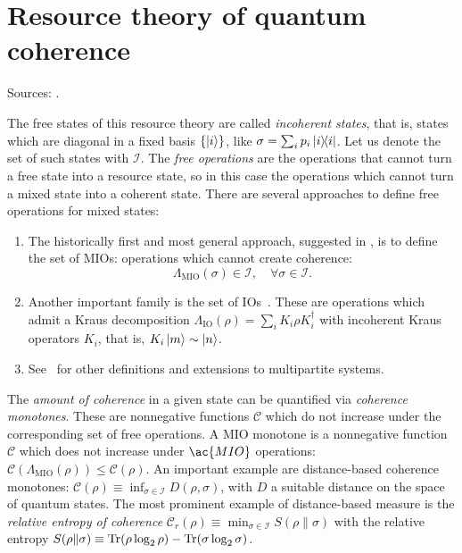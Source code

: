 \documentclass[a4paper]{report}
\newcommand{\on}[1]{\operatorname{#1}}
\begin{document}
\section{Resource theory of quantum coherence}
\newcommand{\setIncoherentStates}{\mathcal{I}}
Sources: \cite{aberg2006quantifying,baumgratz2014quantifying,winter2016operational,marvian2016how,streltsov2016quantum}.

The free states of this resource theory are called \emph{incoherent states},
that is, states which are diagonal in a fixed basis $\{\ket i\}$, like $\sigma = \sum_i p_i \ketbra{i}$.
Let us denote the set of such states with $\setIncoherentStates{}$.
The \emph{free operations} are the operations that cannot turn a free state into a resource state, so in this case the operations which cannot turn a mixed state into a coherent state.
There are several approaches to define free operations for mixed states:
\begin{enumerate}
	\item The historically first and most general approach, suggested in \cite{aberg2006quantifying}, is to define the set of \acp{MIO}: operations which cannot create coherence:
	\begin{equation}
	 	\Lambda_{\on{MIO}}(\sigma) \in \setIncoherentStates{}, \quad \forall \sigma \in \setIncoherentStates{}.
	 \end{equation}
	 \item Another important family is the set of \acp{IO}~\cite{baumgratz2014quantifying}.
	 These are operations which admit a Kraus decomposition $\Lambda_{\on{IO}}(\rho) = \sum_i K_i \rho K_i^\dagger$ with incoherent Kraus operators $K_i$, that is, $K_i \ket m \sim \ket n$.
	 \item See~\cite{streltsov2016maximal} for other definitions and extensions to multipartite systems.
\end{enumerate}
The \emph{amount of coherence} in a given state can be quantified via \emph{coherence monotones}.
These are nonnegative functions $\mathcal C$ which do not increase under the corresponding set of free operations.
A \ac{MIO} monotone is a nonnegative function $\mathcal C$ which does not increase under $\ac{MIO}$ operations:
$\mathcal C(\Lambda_{\on{MIO}}(\rho)) \le \mathcal C(\rho)$.
An important example are distance-based coherence monotones:
$\mathcal C(\rho) \equiv \inf_{\sigma\in\setIncoherentStates{}} D(\rho,\sigma)$,
with $D$ a suitable distance on the space of quantum states.
The most prominent example of distance-based measure is the \emph{relative entropy of coherence}
$\mathcal C_r(\rho) \equiv \min_{\sigma\in\setIncoherentStates{}} S(\rho \| \sigma)$
with the relative entropy
$S(\rho \| \sigma) \equiv \Tr(\rho \log_2\rho) - \Tr(\sigma\log_2\sigma)$.
\end{document}
